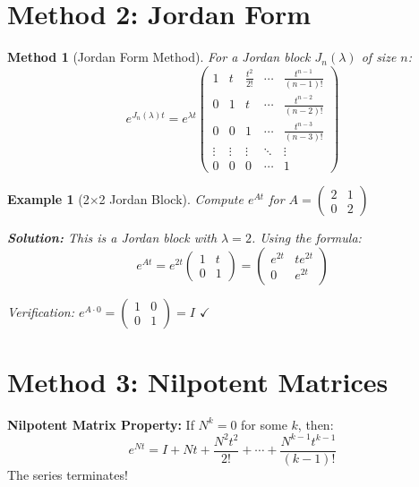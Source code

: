 \documentclass[12pt]{article}
\newtheorem{method}{Method}
\newtheorem{example}{Example}
\begin{document}
\section{Method 2: Jordan Form}

\begin{method}[Jordan Form Method]
For a Jordan block $J_{n}(\lambda)$ of size $n$:
\[e^{J_{n}(\lambda)t} = e^{\lambda t}\begin{pmatrix}
1 & t & \frac{t^{2}}{2!} & \cdots & \frac{t^{n-1}}{(n-1)!} \\
0 & 1 & t & \cdots & \frac{t^{n-2}}{(n-2)!} \\
0 & 0 & 1 & \cdots & \frac{t^{n-3}}{(n-3)!} \\
\vdots & \vdots & \vdots & \ddots & \vdots \\
0 & 0 & 0 & \cdots & 1
\end{pmatrix}\]
\end{method}

\begin{example}[2$\times $2 Jordan Block]
Compute $e^{At}$ for $A = \begin{pmatrix} 2 & 1 \\ 0 & 2 \end{pmatrix}$

\textbf{Solution:}
This is a Jordan block with $\lambda = 2$. Using the formula:
\[e^{At} = e^{2t}\begin{pmatrix} 1 & t \\ 0 & 1 \end{pmatrix} = \begin{pmatrix} e^{2t} & te^{2t} \\ 0 & e^{2t} \end{pmatrix}\]

Verification: $e^{A \cdot 0} = \begin{pmatrix} 1 & 0 \\ 0 & 1 \end{pmatrix} = I$ $\checkmark$
\end{example}

\section{Method 3: Nilpotent Matrices}

\begin{keypoint}
\textbf{Nilpotent Matrix Property:}
If $N^{k} = 0$ for some $k$, then:
\[e^{Nt} = I + Nt + \frac{N^{2}t^2}{2!} + \cdots + \frac{N^{k-1}t^{k-1}}{(k-1)!}\]
The series terminates!
\end{keypoint}
\end{document}
